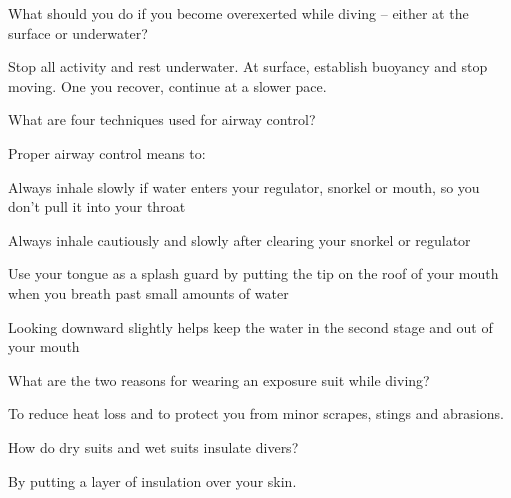 	\begin{qanda}
		\begin{question}
What should you do if you become overexerted while diving -- either at the surface or underwater?
		\end{question}

		\begin{answer}
Stop all activity and rest underwater.  At surface, establish buoyancy and stop moving.  One you recover, continue at a slower pace.
		\end{answer}
	\end{qanda}

	\begin{qanda}
		\begin{question}
What are four techniques used for airway control?
		\end{question}

		\begin{answer}
Proper airway control means to:
			\begin{nospacenumberedlist}
				\item Always inhale slowly if water enters your regulator, snorkel or mouth, so you don't pull it into your throat
				\item Always inhale cautiously and slowly after clearing your snorkel or regulator
				\item Use your tongue as a splash guard by putting the tip on the roof of your mouth when you breath past small amounts of water
				\item Looking downward slightly helps keep the water in the second stage and out of your mouth
			\end{nospacenumberedlist}
		\end{answer}
	\end{qanda}

	\begin{qanda}
		\begin{question}
What are the two reasons for wearing an exposure suit while diving?
		\end{question}

		\begin{answer}
To reduce heat loss and to protect you from minor scrapes, stings and abrasions.
		\end{answer}
	\end{qanda}

	\begin{qanda}
		\begin{question}
How do dry suits and wet suits insulate divers?
		\end{question}

		\begin{answer}
By putting a layer of insulation over your skin.
		\end{answer}
	\end{qanda}

